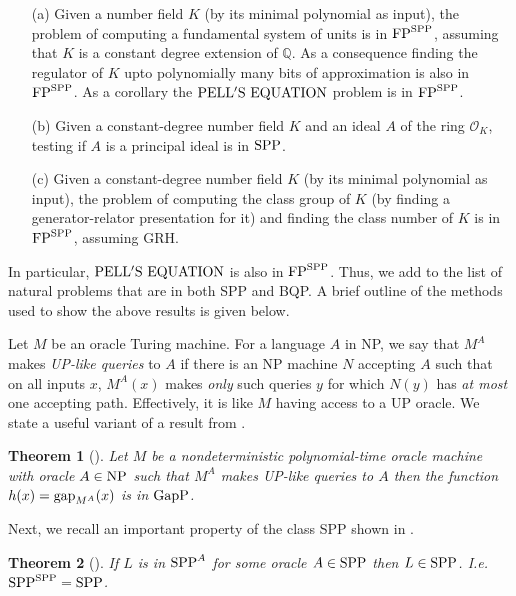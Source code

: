 \documentclass{article}
\newcommand{\pell}{\ensuremath{\rm PELL'S~EQUATION}}
\renewcommand{\O}{\mathcal{O}}
\newcommand{\FP}{{\rm FP}}
\newcommand{\gap}{{\rm gap}}
\newcommand{\NP}{{\rm NP}}
\newcommand{\GapP}{{\rm GapP}}
\newcommand{\SPP}{{\rm SPP}}
\newtheorem{theorem}{Theorem}[section]
\theoremstyle{definition}\newtheorem{remark}[theorem]{Remark}
\begin{document}
\begin{enumerate}
\item[(a)] Given a number field $K$ (by its minimal polynomial as
  input), the problem of computing a fundamental system of units is in
  $\FP^{\SPP}$, assuming that $K$ is a constant degree extension of
  $\mathbb{Q}$. As a consequence finding the regulator of $K$ upto
  polynomially many bits of approximation is also in $\FP^{\SPP}$. As
  a corollary the $\pell$ problem is in $\FP^{\SPP}$.
  
\item[(b)] Given a constant-degree number field $K$ and an ideal $A$
  of the ring $\O_K$, testing if $A$ is a principal ideal is in
  $\SPP$.
  
\item[(c)] Given a constant-degree number field $K$ (by its minimal
  polynomial as input), the problem of computing the class group of
  $K$ (by finding a generator-relator presentation for it) and finding
  the class number of $K$ is in $\FP^{\SPP}$, assuming GRH.
\end{enumerate}

In particular, $\pell$ is also in $\FP^{\SPP}$. Thus, we add to the
list of natural problems that are in both SPP and BQP. A brief outline
of the methods used to show the above results is given below.

Let $M$ be an oracle Turing machine. For a language $A$ in NP, we say
that $M^A$ makes {\em UP-like queries} to $A$ if there is an NP
machine $N$ accepting $A$ such that on all inputs $x$, $M^A(x)$ makes
{\em only} such queries $y$ for which $N(y)$ has {\em at most} one
accepting path.  Effectively, it is like $M$ having access to a UP
oracle. We state a useful variant of a result from \cite{gi-book}.

\begin{theorem}[\cite{gi-book}]\label{KST-theorem}
  Let $M$ be a nondeterministic polynomial-time oracle machine with
  oracle $A\in\NP$ such that $M^A$ makes UP-like queries to $A$ then
  the function $h(x)=\gap_{M^{A}}(x)$ is in $\GapP$.
\end{theorem} 

Next, we recall an important property of the class SPP shown in
\cite{fenner91gapdefinable}.

\begin{theorem}[\cite{fenner91gapdefinable}]\label{SPP-self-low}
  If $L$ is in $\SPP^A$ for some oracle $A\in\SPP$ then $L\in\SPP$.
  I.e.\ $\SPP^{\SPP}=\SPP$.
\end{theorem}
\end{document}
